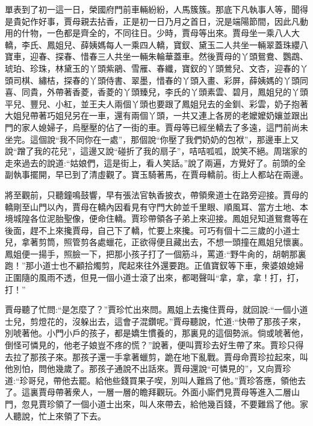\begin{parag}
    單表到了初一這一日，榮國府門前車輛紛紛，人馬簇簇。那底下凡執事人等，聞得是貴妃作好事，賈母親去拈香，正是初一日乃月之首日，況是端陽節間，因此凡動用的什物，一色都是齊全的，不同往日。少時，賈母等出來。賈母坐一乘八人大轎，李氏、鳳姐兒、薛姨媽每人一乘四人轎，寶釵、黛玉二人共坐一輛翠蓋珠纓八寶車，迎春、探春、惜春三人共坐一輛朱輪華蓋車。然後賈母的丫頭鴛鴦、鸚鵡、琥珀、珍珠，林黛玉的丫頭紫鵑、雪雁、春纖，寶釵的丫頭鶯兒、文杏，迎春的丫頭司棋、繡桔，探春的丫頭侍書、翠墨，惜春的丫頭入畫、彩屏，薛姨媽的丫頭同喜、同貴，外帶著香菱，香菱的丫頭臻兒，李氏的丫頭素雲、碧月，鳳姐兒的丫頭平兒、豐兒、小紅，並王夫人兩個丫頭也要跟了鳳姐兒去的金釧、彩雲，奶子抱著大姐兒帶著巧姐兒另在一車，還有兩個丫頭，一共又連上各房的老嬤嬤奶孃並跟出門的家人媳婦子，烏壓壓的佔了一街的車。賈母等已經坐轎去了多遠，這門前尚未坐完。這個說“我不同你在一處”，那個說“你壓了我們奶奶的包袱”，那邊車上又說“蹭了我的花兒”，這邊又說“碰折了我的扇子”，咭咭呱呱，說笑不絕。周瑞家的走來過去的說道:“姑娘們，這是街上，看人笑話。”說了兩遍，方覺好了。前頭的全副執事擺開，早已到了清虛觀了。寶玉騎著馬，在賈母轎前。街上人都站在兩邊。
\end{parag}


\begin{parag}
    將至觀前，只聽鐘鳴鼓響，早有張法官執香披衣，帶領衆道士在路旁迎接。賈母的轎剛至山門以內，賈母在轎內因看見有守門大帥並千里眼、順風耳、當方土地、本境城隍各位泥胎聖像，便命住轎。賈珍帶領各子弟上來迎接。鳳姐兒知道鴛鴦等在後面，趕不上來攙賈母，自己下了轎，忙要上來攙。可巧有個十二三歲的小道士兒，拿著剪筒，照管剪各處蠟花，正欲得便且藏出去，不想一頭撞在鳳姐兒懷裏。鳳姐便一揚手，照臉一下，把那小孩子打了一個筋斗，罵道:“野牛肏的，胡朝那裏跑！”那小道士也不顧拾燭剪，爬起來往外還要跑。正值寶釵等下車，衆婆娘媳婦正圍隨的風雨不透，但見一個小道士滾了出來，都喝聲叫“拿，拿，拿！打，打，打！”
\end{parag}


\begin{parag}
    賈母聽了忙問:“是怎麼了？”賈珍忙出來問。鳳姐上去攙住賈母，就回說:“一個小道士兒，剪燈花的，沒躲出去，這會子混鑽呢。”賈母聽說，忙道:“快帶了那孩子來，別唬著他。小門小戶的孩子，都是嬌生慣養的，那裏見的這個勢派。倘或唬著他，倒怪可憐見的，他老子娘豈不疼的慌？”說著，便叫賈珍去好生帶了來。賈珍只得去拉了那孩子來。那孩子還一手拿著蠟剪，跪在地下亂戰。賈母命賈珍拉起來，叫他別怕，問他幾歲了。那孩子通說不出話來。賈母還說“可憐見的”，又向賈珍道:“珍哥兒，帶他去罷。給他些錢買果子喫，別叫人難爲了他。”賈珍答應，領他去了。這裏賈母帶著衆人，一層一層的瞻拜觀玩。外面小廝們見賈母等進入二層山門，忽見賈珍領了一個小道士出來，叫人來帶去，給他幾百錢，不要難爲了他。家人聽說，忙上來領了下去。
\end{parag}


